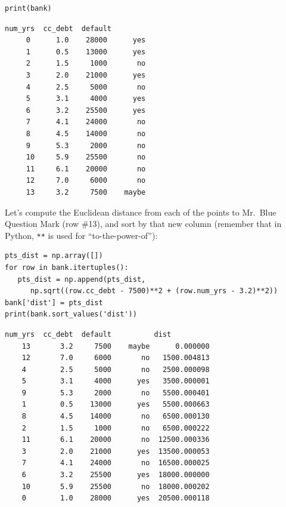 \vspace{-.2in}
\begin{Verbatim}[fontsize=\footnotesize,samepage=true,frame=single,framesep=2mm]
print(bank)
\end{Verbatim}
\vspace{-.4in}

\begin{Verbatim}[fontsize=\footnotesize,samepage=true,frame=leftline,framesep=5mm,framerule=1mm]
        num_yrs  cc_debt  default
     0      1.0    28000      yes
     1      0.5    13000      yes
     2      1.5     1000       no
     3      2.0    21000      yes
     4      2.5     5000       no
     5      3.1     4000      yes
     6      3.2    25500      yes
     7      4.1    24000       no
     8      4.5    14000       no
     9      5.3     2000       no
     10     5.9    25500       no
     11     6.1    20000       no
     12     7.0     6000       no
     13     3.2     7500    maybe
\end{Verbatim}

Let's compute the Euclidean distance from each of the points to Mr.~Blue
Question Mark (row \#13), and sort by that new column (remember that in Python, 
\texttt{**} is used for ``to-the-power-of''):


\vspace{-.3in}
\begin{Verbatim}[fontsize=\footnotesize,samepage=true,frame=single,framesep=3mm]
pts_dist = np.array([])
for row in bank.itertuples():
   pts_dist = np.append(pts_dist,
      np.sqrt((row.cc_debt - 7500)**2 + (row.num_yrs - 3.2)**2))
bank['dist'] = pts_dist
print(bank.sort_values('dist'))
\end{Verbatim}
\vspace{-.2in}

\begin{Verbatim}[fontsize=\small,samepage=true,frame=leftline,framesep=5mm,framerule=1mm]
         num_yrs  cc_debt  default          dist
    13       3.2     7500    maybe      0.000000
    12       7.0     6000       no   1500.004813
    4        2.5     5000       no   2500.000098
    5        3.1     4000      yes   3500.000001
    9        5.3     2000       no   5500.000401
    1        0.5    13000      yes   5500.000663
    8        4.5    14000       no   6500.000130
    2        1.5     1000       no   6500.000222
    11       6.1    20000       no  12500.000336
    3        2.0    21000      yes  13500.000053
    7        4.1    24000       no  16500.000025
    6        3.2    25500      yes  18000.000000
    10       5.9    25500       no  18000.000202
    0        1.0    28000      yes  20500.000118
\end{Verbatim}

